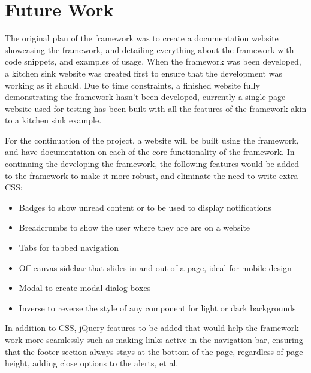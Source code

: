 \newpage
\chapter*{Future Work}



The original plan of the framework was to create a documentation website showcasing the framework, and detailing everything about the framework with code snippets, and examples of usage. When the framework was been developed, a kitchen sink website was created first to ensure that the development was working as it should. Due to time constraints, a finished website fully demonstrating the framework hasn't been developed, currently a single page website used for testing has been built with all the features of the framework akin to a kitchen sink example. 

For the continuation of the project, a website will be built using the framework, and have documentation on each of the core functionality of the framework. In continuing the developing the framework, the following features would be added to the framework to make it more robust, and eliminate the need to write extra CSS:
\begin{itemize}
	\item Badges to show unread content or to be used to display notifications
	\item Breadcrumbs to show the user where they are are on a website
	\item Tabs for tabbed navigation
	\item Off canvas sidebar that slides in and out of a page, ideal for mobile design
	\item Modal to create modal dialog boxes
	\item Inverse to reverse the style of any component for light or dark backgrounds
\end{itemize}

In addition to CSS, jQuery features to be added that would help the framework work more seamlessly such as making links active in the navigation bar, ensuring that the footer section always stays at the bottom of the page, regardless of page height, adding close options to the alerts, et al. 

%
%

